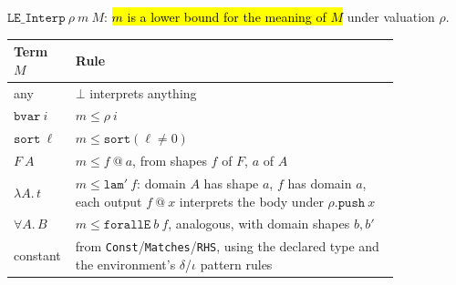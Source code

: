 \begin{definition}
\label{def:expa-le-interp}
\leanok
{}

 $\mathtt{LE\_Interp}\ \rho\ m\ M$: \hl{$m$ is a lower bound for the meaning of $M$}
under valuation $\rho$.
\begin{center}
\begin{tabular}{lp{0.84\linewidth}}
\toprule
Term $M$ & Rule \\
\midrule
any & $\bot$ interprets anything \\
$\mathtt{bvar}\ i$ & $m\le\rho\ i$ \\
$\mathtt{sort}\ \ell$ & $m\le\mathtt{sort}(\ell\neq 0)$ \\
$F\ A$ & $m\le f\ @\ a$, from shapes $f$ of $F$, $a$ of $A$ \\
$\lambda A.\,t$ & $m\le\mathtt{lam}'\ f$: domain $A$ has shape $a$, $f$ has domain $a$, each output
$f\ @\ x$ interprets the body under $\rho.\mathtt{push}\ x$ \\
$\forall A.\,B$ & $m\le\mathtt{forallE}\ b\ f$, analogous, with domain shapes $b,b'$ \\
constant & from \texttt{Const}/\texttt{Matches}/\texttt{RHS}, using the declared type and the
environment's $\delta$/$\iota$ pattern rules \\
\bottomrule
\end{tabular}\par\smallskip
\end{center}
\end{definition}

